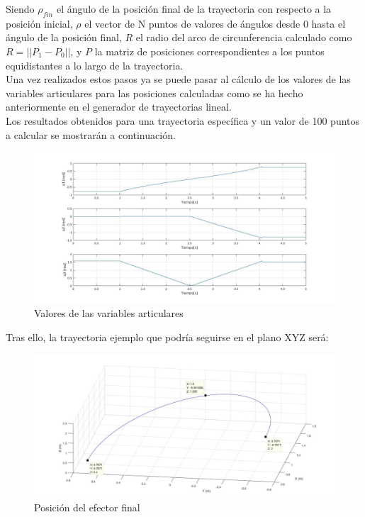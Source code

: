 \begin{itemize}
	Siendo $\rho_{fin}$ el ángulo de la posición final de la trayectoria con respecto a la posición inicial, $\rho$ el vector de N puntos de valores de ángulos desde 0 hasta el ángulo de la posición final, $R$ el radio del arco de circunferencia calculado como $R=||P_1-P_0||$, y $P$ la matriz de posiciones correspondientes a los puntos equidistantes a lo largo de la trayectoria.\\

	Una vez realizados estos pasos ya se puede pasar al cálculo de los valores de las variables articulares para las posiciones calculadas como se ha hecho anteriormente en el generador de trayectorias lineal.\\

	Los resultados obtenidos para una trayectoria específica y un valor de 100 puntos a calcular se mostrarán a continuación.
	\begin{figure}[h!]
	\centering
	\includegraphics[width=.7\textwidth]{GDT_C_articulares}
	\caption{Valores de las variables articulares}
	\end{figure}

\newpage
Tras ello, la trayectoria ejemplo que podría seguirse en el plano XYZ será:
	\begin{figure}[h!]
	\centering
	\includegraphics[width=.8\textwidth]{GDT_C_efector}
	\caption{Posición del efector final}
	\end{figure}




\end{itemize}


